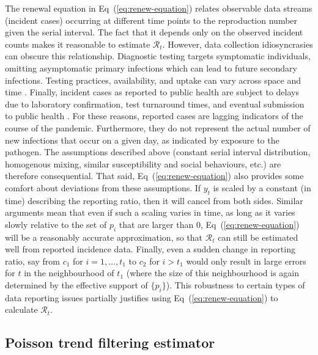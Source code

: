 \documentclass[10pt,letterpaper]{article}
\def\calR{\mathcal{R}}
\newcommand{\citep}[1]{\cite{#1}}
\renewcommand{\eqref}[1]{Eq~(\ref{#1})}
\begin{document}
The renewal equation in \eqref{eq:renew-equation} relates observable data
streams (incident cases) occurring at different time points to the reproduction
number given the serial interval. The fact that it depends only on the observed
incident counts makes it reasonable to estimate $\calR_t$. However, 
data collection idiosyncrasies can obscure this relationship. Diagnostic testing
targets symptomatic individuals, omitting asymptomatic primary infections which
can lead to future secondary infections. Testing practices, availability, and
uptake can vary across space and time \citep{pitzer2021impact,
hitchings2021usefulness}. Finally, incident cases as reported to public health
are subject to delays due to laboratory confirmation, test turnaround times, and
eventual submission to public health \citep{pellis2021challenges}. For these
reasons, reported cases are lagging indicators of the course of the pandemic.
Furthermore, they do not represent the actual number of new infections that
occur on a given day, as indicated by exposure to the pathogen. The assumptions
described above (constant serial interval distribution, homogenous mixing,
similar susceptibility and social behaviours, etc.) are therefore consequential.
That said, \eqref{eq:renew-equation} also provides some comfort about deviations
from these assumptions. If $y_t$ is scaled by a constant (in time) describing
the reporting ratio, then it will cancel from both sides. Similar arguments mean
that even if such a scaling varies in time, as long as it varies slowly relative
to the set of $p_i$ that are larger than 0, \eqref{eq:renew-equation} will be a
reasonably accurate approximation, so that $\calR_t$ can still be estimated well
from reported incidence data. Finally, even a sudden change in reporting ratio, 
say from $c_1$ for $i=1,\ldots,t_1$ to $c_2$ for $i>t_1$ would only result in 
large errors for $t$ in the neighbourhood of $t_1$ (where the size of this 
neighbourhood is again determined by the effective support of $\{p_i\}$). 
This robustness to certain types of data reporting issues partially justifies 
using \eqref{eq:renew-equation} to calculate $\calR_t$.


\subsection{Poisson trend filtering estimator} 
\end{document}
